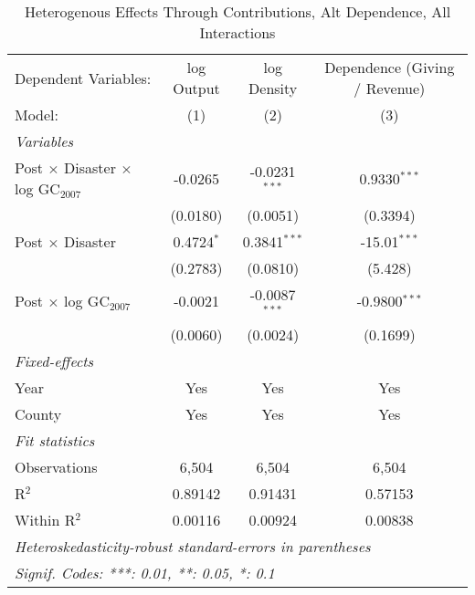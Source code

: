 
\begin{table}[htbp]
   \caption{Heterogenous Effects Through Contributions, Alt Dependence, All Interactions}
   \centering
   \begin{adjustbox}{max width = \textwidth, center}
      \begin{tabular}{lccc}
         \tabularnewline \midrule \midrule
         Dependent Variables:                              & log Output   & log Density     & Dependence (Giving / Revenue)\\  
         Model:                                            & (1)          & (2)             & (3)\\  
         \midrule
         \emph{Variables}\\
         Post $\times$ Disaster $\times$ log GC$_{2007}$   & -0.0265      & -0.0231$^{***}$ & 0.9330$^{***}$\\   
                                                           & (0.0180)     & (0.0051)        & (0.3394)\\   
         Post $\times$ Disaster                            & 0.4724$^{*}$ & 0.3841$^{***}$  & -15.01$^{***}$\\   
                                                           & (0.2783)     & (0.0810)        & (5.428)\\   
         Post $\times$ log GC$_{2007}$                     & -0.0021      & -0.0087$^{***}$ & -0.9800$^{***}$\\   
                                                           & (0.0060)     & (0.0024)        & (0.1699)\\   
         \midrule
         \emph{Fixed-effects}\\
         Year                                              & Yes          & Yes             & Yes\\  
         County                                            & Yes          & Yes             & Yes\\  
         \midrule
         \emph{Fit statistics}\\
         Observations                                      & 6,504        & 6,504           & 6,504\\  
         R$^2$                                             & 0.89142      & 0.91431         & 0.57153\\  
         Within R$^2$                                      & 0.00116      & 0.00924         & 0.00838\\  
         \midrule \midrule
         \multicolumn{4}{l}{\emph{Heteroskedasticity-robust standard-errors in parentheses}}\\
         \multicolumn{4}{l}{\emph{Signif. Codes: ***: 0.01, **: 0.05, *: 0.1}}\\
      \end{tabular}
   \end{adjustbox}
\end{table}


